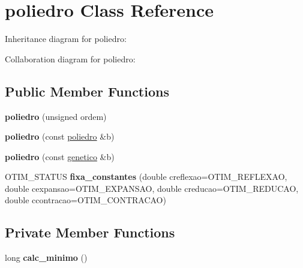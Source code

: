 \hypertarget{classpoliedro}{}\section{poliedro Class Reference}
\label{classpoliedro}


Inheritance diagram for poliedro\+:


Collaboration diagram for poliedro\+:
\subsection*{Public Member Functions}
\begin{DoxyCompactItemize}
\item 
{\bfseries poliedro} (unsigned ordem)\hypertarget{classpoliedro_a52deb91663b4143cc50539fe94b68103}{}\label{classpoliedro_a52deb91663b4143cc50539fe94b68103}

\item 
{\bfseries poliedro} (const \hyperlink{classpoliedro}{poliedro} \&b)\hypertarget{classpoliedro_a9a6b9509f1ddd0934a5f66c3beee3655}{}\label{classpoliedro_a9a6b9509f1ddd0934a5f66c3beee3655}

\item 
{\bfseries poliedro} (const \hyperlink{classgenetico}{genetico} \&b)\hypertarget{classpoliedro_a9695e8a67f659ca6cc206d64d520580f}{}\label{classpoliedro_a9695e8a67f659ca6cc206d64d520580f}

\item 
O\+T\+I\+M\+\_\+\+S\+T\+A\+T\+US {\bfseries fixa\+\_\+constantes} (double creflexao=O\+T\+I\+M\+\_\+\+R\+E\+F\+L\+E\+X\+AO, double cexpansao=O\+T\+I\+M\+\_\+\+E\+X\+P\+A\+N\+S\+AO, double creducao=O\+T\+I\+M\+\_\+\+R\+E\+D\+U\+C\+AO, double ccontracao=O\+T\+I\+M\+\_\+\+C\+O\+N\+T\+R\+A\+C\+AO)\hypertarget{classpoliedro_a651d8450f38c33fafb07c0c30d8d958a}{}\label{classpoliedro_a651d8450f38c33fafb07c0c30d8d958a}

\end{DoxyCompactItemize}
\subsection*{Private Member Functions}
\begin{DoxyCompactItemize}
\item 
long {\bfseries calc\+\_\+minimo} ()\hypertarget{classpoliedro_a002761a56046e88b8e9c0afdbfa04a36}{}\label{classpoliedro_a002761a56046e88b8e9c0afdbfa04a36}

\end{DoxyCompactItemize}
